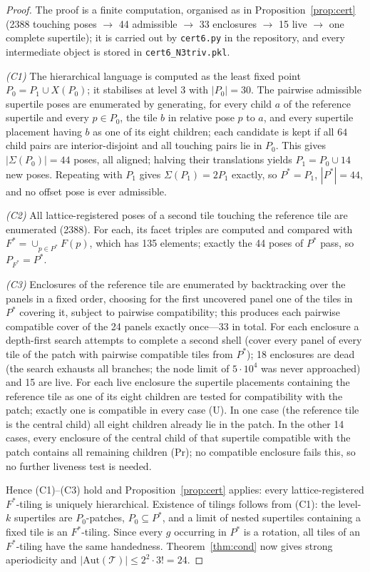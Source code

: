\documentclass[11pt,a4paper]{article}
\theoremstyle{plain}
\theoremstyle{definition}
\begin{document}
\begin{proof}
The proof is a finite computation, organised as in Proposition~\ref{prop:cert} (2388 touching poses $\to$ 44 admissible $\to$ 33 enclosures $\to$ 15 live $\to$ one complete supertile); it is carried out by \texttt{cert6.py} in the repository, and every intermediate object is stored in \texttt{cert6\_N3triv.pkl}.

\emph{(C1)} The hierarchical language is computed as the least fixed point $P_0 = P_1 \cup X(P_0)$; it stabilises at level 3 with $|P_0| = 30$. The pairwise admissible supertile poses are enumerated by generating, for every child $a$ of the reference supertile and every $p \in P_0$, the tile $b$ in relative pose $p$ to $a$, and every supertile placement having $b$ as one of its eight children; each candidate is kept if all $64$ child pairs are interior-disjoint and all touching pairs lie in $P_0$. This gives $|\Sigma(P_0)| = 44$ poses, all aligned; halving their translations yields $P_1 = P_0 \cup 14$ new poses. Repeating with $P_1$ gives $\Sigma(P_1) = 2P_1$ exactly, so $P^* = P_1$, $|P^*| = 44$, and no offset pose is ever admissible.

\emph{(C2)} All lattice-registered poses of a second tile touching the reference tile are enumerated (2388). For each, its facet triples are computed and compared with $F^* = \cup_{p \in P^*} F(p)$, which has 135 elements; exactly the 44 poses of $P^*$ pass, so $P_{F^*} = P^*$.

\emph{(C3)} Enclosures of the reference tile are enumerated by backtracking over the panels in a fixed order, choosing for the first uncovered panel one of the tiles in $P^*$ covering it, subject to pairwise compatibility; this produces each pairwise compatible cover of the 24 panels exactly once---33 in total. For each enclosure a depth-first search attempts to complete a second shell (cover every panel of every tile of the patch with pairwise compatible tiles from $P^*$); 18 enclosures are dead (the search exhausts all branches; the node limit of $5 \cdot 10^4$ was never approached) and 15 are live. For each live enclosure the supertile placements containing the reference tile as one of its eight children are tested for compatibility with the patch; exactly one is compatible in every case (U). In one case (the reference tile is the central child) all eight children already lie in the patch. In the other 14 cases, every enclosure of the central child of that supertile compatible with the patch contains all remaining children (Pr); no compatible enclosure fails this, so no further liveness test is needed.

Hence (C1)--(C3) hold and Proposition~\ref{prop:cert} applies: every lattice-registered $F^*$-tiling is uniquely hierarchical. Existence of tilings follows from (C1): the level-$k$ supertiles are $P_0$-patches, $P_0 \subseteq P^*$, and a limit of nested supertiles containing a fixed tile is an $F^*$-tiling. Since every $g$ occurring in $P^*$ is a rotation, all tiles of an $F^*$-tiling have the same handedness. Theorem~\ref{thm:cond} now gives strong aperiodicity and $|\mathrm{Aut}(\mathcal{T})| \le  2^2 \cdot 3! = 24$.
\end{proof}
\end{document}
